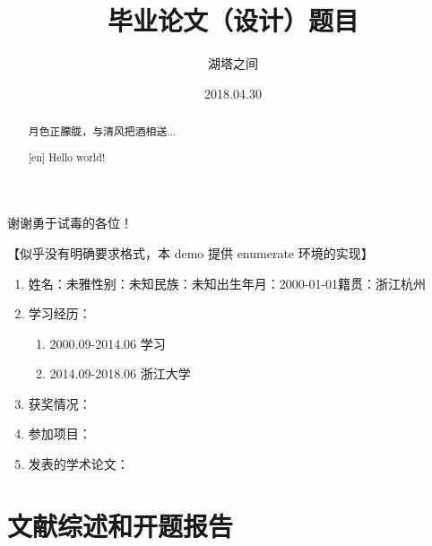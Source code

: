 \documentclass[fangfont=STFANGSO.TTF,heifont=simhei.ttf,nocolorbib]{zju-thesis}
\title{毕业论文（设计）题目}{浙江大学本科生毕业论文（设计）}
\author{湖塔之间}{3140100000}
\date{2018.04.30}
\begin{document}
	\makecover
	
	\begin{acknowledgement}
	谢谢勇于试毒的各位！
	\end{acknowledgement}
	\begin{abstract}
	月色正朦胧，与清风把酒相送...

	\end{abstract}
	\begin{abstract}[en]
	Hello world!

	\end{abstract}

    \tableofcontents
	\begin{refsection}
	
	\end{refsection}
	\begin{resume}
		【似乎没有明确要求格式，本 demo 提供 enumerate 环境的实现】

		\begin{enumerate}[label=,leftmargin=0em]
		\item 姓名：未雅\quad 性别：未知\quad 民族：未知\quad 出生年月：2000-01-01\quad 籍贯：浙江杭州
		\item 学习经历：
		\begin{enumerate}[label=]
		\item 2000.09-2014.06 学习
		\item 2014.09-2018.06 浙江大学
		\end{enumerate}
		\item 获奖情况：
		\item 参加项目：
		\item 发表的学术论文：
		\end{enumerate}
	\end{resume}


	
	
	\part{文献综述和开题报告}
	\renewcommand\thechapter{\zhnum{chapter}、} 
	
\end{document}
